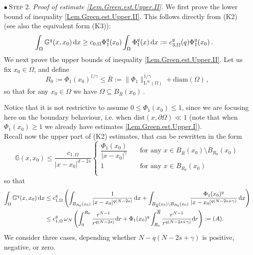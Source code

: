 \documentclass[11pt]{article}
\numberwithin{equation}{section}
\newcommand{\dx}{\,{\rm d}x}
\newcommand{\rd}{{\rm d}}
\def\LL{\mathrm{L}} %
\newcommand{\K}{{\mathbb G}}
\def\dist{\mathrm{dist}} %
\def\diam{\mathrm{diam}} %
\begin{document}
\smallskip

\noindent$\bullet~$\textsc{Step 2. }\textit{Proof of estimate \eqref{Lem.Green.est.Upper.II}. }We first prove the lower bound of inequality \eqref{Lem.Green.est.Upper.II}. This follows directly from (K2) (see also the equivalent form (K3)):
\[\begin{split}
\int_{\Omega}\K^q(x , x_0)\dx
&\ge c_{0,\Omega} \Phi_1^q(x_0) \int_{\Omega}\Phi_1^q(x) \dx :=c_{3,\Omega}^q(q)\Phi_1^q(x_0)\,.
\end{split}
\]
We next prove the upper bounds of inequality \eqref{Lem.Green.est.Upper.II}. Let us fix $x_0\in \Omega$, and define
\[
R_0:=\Phi_1(x_0)^{1/\gamma}\le \overline{R}:=\|\Phi_1\|_{\LL^\infty(\Omega)}^{1/\gamma}+\diam(\Omega)\,,
\]
so that for any $x_0\in\Omega$ we have $\Omega\subseteq B_{\overline{R}}(x_0)$\,.

Notice that it is not restrictive to assume $0\le \Phi_1(x_0)\le 1$, since we are focusing here on the boundary behaviour, i.e. when $\dist(x, \partial\Omega)\ll 1$ (note that when $\Phi_1(x_0)\ge 1$ we already have estimates \eqref{Lem.Green.est.Upper.I}).\\
Recall now the upper part of (K2) estimates, that can be rewritten in the form
\begin{equation}\label{typeII.Green.est.b}
\K(x,x_0)\le
\frac{c_{1,\Omega}}{|x-x_0|^{d-2s}}%
\left\{\begin{array}{cl}
\dfrac{\Phi_1(x_0)}{|x-x_0|^\gamma} &\quad\mbox{for any }x\in B_{\overline{R}}(x_0)\setminus B_{R_0}(x_0)\\
1&\quad\mbox{for any }x\in B_{R_0}(x_0)\\
\end{array}\right.
\end{equation}
so that
\[\begin{split}
\int_{\Omega}\K^q(x , x_0)\dx
&\le c_{1,\Omega}^q\left(\int_{B_{R_0}(x_0)}\frac{1}{|x-x_0|^{q(N-2s)}}\dx +\int_{B_{\overline{R}}(x_0)\setminus B_{R_0}(x_0)}\frac{\Phi_1(x_0)^q}{|x-x_0|^{q(N-2s+\gamma)}}\dx\right)\\
&\le c_{1,\Omega}^q\,\omega_N\left(\int_0^{R_0}\frac{r^{N-1}}{r^{q(N-2s)}}\rd r +\Phi_1(x_0)^q\int_{R_0}^{\overline{R}}\frac{r^{N-1}}{r^{q(N-2s+\gamma)}}\rd r\right)
:=(A).
\end{split}
\]
We consider  three cases, depending whether $N-q(N-2s+\gamma)$ is positive, negative, or zero.
\end{document}
